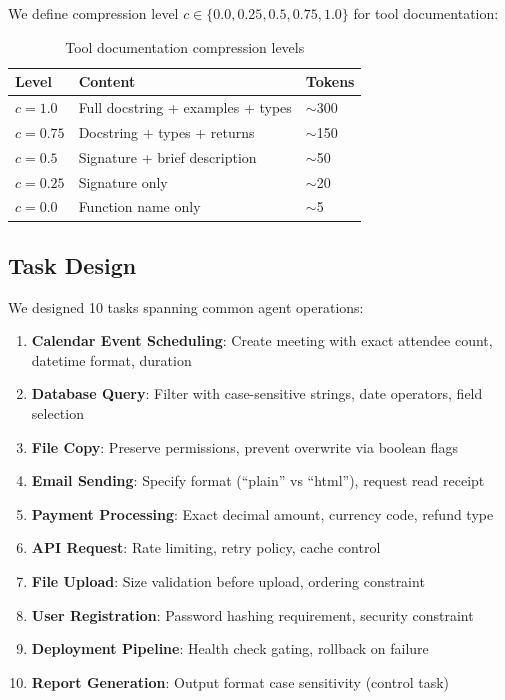 \documentclass[11pt]{article}
\begin{document}
We define compression level $c \in \{0.0, 0.25, 0.5, 0.75, 1.0\}$ for tool documentation:

\begin{table}[h]
\centering
\small
\begin{tabular}{lll}
\toprule
\textbf{Level} & \textbf{Content} & \textbf{Tokens} \\
\midrule
$c=1.0$ & Full docstring + examples + types & $\sim$300 \\
$c=0.75$ & Docstring + types + returns & $\sim$150 \\
$c=0.5$ & Signature + brief description & $\sim$50 \\
$c=0.25$ & Signature only & $\sim$20 \\
$c=0.0$ & Function name only & $\sim$5 \\
\bottomrule
\end{tabular}
\caption{Tool documentation compression levels}
\label{tab:compression}
\end{table}

\subsection{Task Design}

We designed 10 tasks spanning common agent operations:

\begin{enumerate}
\item \textbf{Calendar Event Scheduling}: Create meeting with exact attendee count, datetime format, duration
\item \textbf{Database Query}: Filter with case-sensitive strings, date operators, field selection
\item \textbf{File Copy}: Preserve permissions, prevent overwrite via boolean flags
\item \textbf{Email Sending}: Specify format (``plain'' vs ``html''), request read receipt
\item \textbf{Payment Processing}: Exact decimal amount, currency code, refund type
\item \textbf{API Request}: Rate limiting, retry policy, cache control
\item \textbf{File Upload}: Size validation before upload, ordering constraint
\item \textbf{User Registration}: Password hashing requirement, security constraint
\item \textbf{Deployment Pipeline}: Health check gating, rollback on failure
\item \textbf{Report Generation}: Output format case sensitivity (control task)
\end{enumerate}
\end{document}
